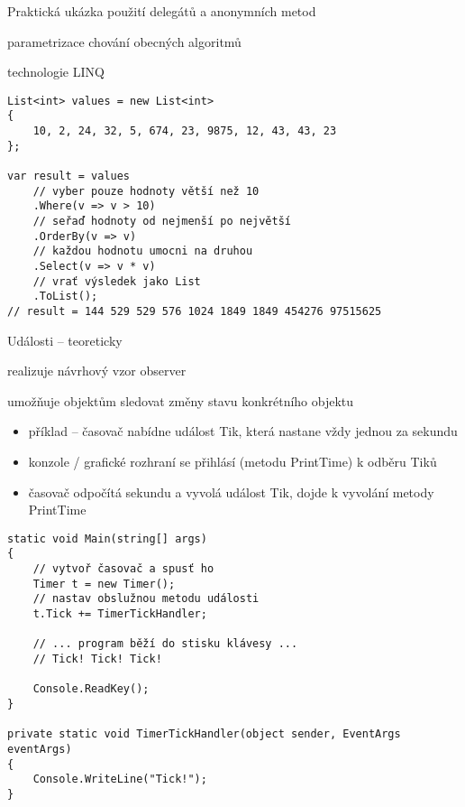 \begin{frame}[fragile]
\begin{bitemize}{Praktická ukázka použití delegátů a anonymních metod}
\item parametrizace chování obecných algoritmů
\item technologie LINQ
\end{bitemize}
\vfill
\begin{yesblock}
\begin{lstlisting}
List<int> values = new List<int>
{
    10, 2, 24, 32, 5, 674, 23, 9875, 12, 43, 43, 23
};

var result = values
    // vyber pouze hodnoty větší než 10
    .Where(v => v > 10)
    // seřaď hodnoty od nejmenší po největší
    .OrderBy(v => v)
    // každou hodnotu umocni na druhou
    .Select(v => v * v)
    // vrať výsledek jako List
    .ToList();
// result = 144 529 529 576 1024 1849 1849 454276 97515625
\end{lstlisting}
\end{yesblock}
\end{frame}




\begin{frame}[fragile]
\begin{bitemize}{Události -- teoreticky}
\item realizuje návrhový vzor observer
\item umožňuje objektům sledovat změny stavu konkrétního objektu
\begin{itemize}
\item příklad -- časovač nabídne událost Tik, která nastane vždy jednou za sekundu
\item konzole / grafické rozhraní se přihlásí (metodu PrintTime) k odběru Tiků
\item časovač odpočítá sekundu a vyvolá událost Tik, dojde k vyvolání metody PrintTime
\end{itemize}

\end{bitemize}
\end{frame}



\begin{frame}[fragile]
\begin{yesblock}
\begin{lstlisting}
static void Main(string[] args)
{
	// vytvoř časovač a spusť ho
    Timer t = new Timer();
    // nastav obslužnou metodu události
    t.Tick += TimerTickHandler;

    // ... program běží do stisku klávesy ...
    // Tick! Tick! Tick!

    Console.ReadKey();
}

private static void TimerTickHandler(object sender, EventArgs eventArgs)
{
    Console.WriteLine("Tick!");
}
\end{lstlisting}
\end{yesblock}
\end{frame}



